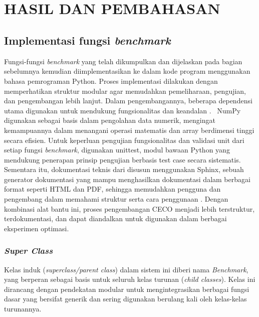 
\chapter[HASIL DAN PEMBAHASAN]{\\ HASIL DAN PEMBAHASAN}

\section{Implementasi fungsi \textit{benchmark}}
Fungsi-fungsi \textit{benchmark} yang telah dikumpulkan dan dijelaskan pada bagian sebelumnya kemudian diimplementasikan ke dalam kode program menggunakan bahasa pemrograman Python. Proses implementasi dilakukan dengan memperhatikan struktur modular agar memudahkan pemeliharaan, pengujian, dan pengembangan lebih lanjut. Dalam pengembangannya, beberapa dependensi utama digunakan untuk mendukung fungsionalitas dan keandalan .\  NumPy digunakan sebagai basis dalam pengolahan data numerik, mengingat kemampuannya dalam menangani operasi matematis dan array berdimensi tinggi secara efisien. Untuk keperluan pengujian fungsionalitas dan validasi unit dari setiap fungsi \textit{benchmark}, digunakan unittest, modul bawaan Python yang mendukung penerapan prinsip pengujian berbasis test case secara sistematis. Sementara itu, dokumentasi teknis dari  disusun menggunakan Sphinx, sebuah generator dokumentasi yang mampu menghasilkan dokumentasi dalam berbagai format seperti HTML dan PDF, sehingga memudahkan pengguna dan pengembang dalam memahami struktur serta cara penggunaan . Dengan kombinasi alat bantu ini, proses pengembangan  CECO menjadi lebih terstruktur, terdokumentasi, dan dapat diandalkan untuk digunakan dalam berbagai eksperimen optimasi.

\subsection{\textit{Super Class}}
Kelas induk (\textit{superclass/parent class}) dalam sistem ini diberi nama \textit{Benchmark}, yang berperan sebagai basis untuk seluruh kelas turunan (\textit{child classes}). Kelas ini dirancang dengan pendekatan modular untuk mengintegrasikan berbagai fungsi dasar yang bersifat generik dan sering digunakan berulang kali oleh kelas-kelas turunannya.\\
